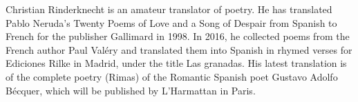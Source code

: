 Christian Rinderknecht is an amateur translator of poetry. He has
translated Pablo Neruda's Twenty Poems of Love and a Song of Despair
from Spanish to French for the publisher Gallimard in 1998. In 2016,
he collected poems from the French author Paul Valéry and translated
them into Spanish in rhymed verses for Ediciones Rilke in Madrid,
under the title Las granadas. His latest translation is of the
complete poetry (Rimas) of the Romantic Spanish poet Gustavo Adolfo
Bécquer, which will be published by L'Harmattan in Paris.
